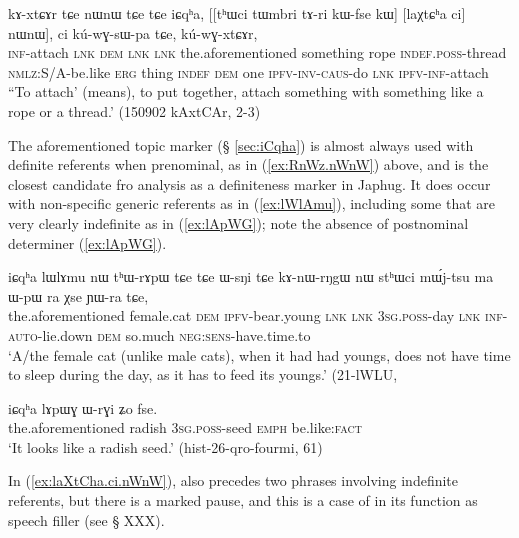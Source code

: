 \begin{exe}
\ex \label{ex:laXtCha.ci.nWnW}
\gll  kɤ-xtɕɤr tɕe nɯnɯ tɕe tɕe iɕqʰa, [[tʰɯci tɯmbri tɤ-ri kɯ-fse kɯ] [laχtɕʰa ci] nɯnɯ], ci kú-wɣ-sɯ-pa tɕe, kú-wɣ-xtɕɤr, \\
\textsc{inf}-attach \textsc{lnk} \textsc{dem} \textsc{lnk} \textsc{lnk} the.aforementioned something rope \textsc{indef}.\textsc{poss}-thread \textsc{nmlz}:S/A-be.like \textsc{erg} thing \textsc{indef} \textsc{dem} one \textsc{ipfv}-\textsc{inv}-\textsc{caus}-do \textsc{lnk} \textsc{ipfv}-\textsc{inf}-attach \\
\glt ``To attach' (means), to put together, attach something with something like a rope or a thread.'  (150902 kAxtCAr, 2-3)
\end{exe}

The aforementioned topic marker  (§ \ref{sec:iCqha}) is almost always used with definite referents when prenominal, as in (\ref{ex:RnWz.nWnW}) above, and is the closest candidate fro analysis as a definiteness marker in Japhug. It does occur with non-specific generic referents as in (\ref{ex:lWlAmu}), including some that are very clearly indefinite as in (\ref{ex:lApWG}); note the absence of postnominal determiner  (\ref{ex:lApWG}).

\begin{exe}
\ex \label{ex:lWlAmu}
 \gll iɕqʰa lɯlɤmu nɯ tʰɯ-rɤpɯ tɕe tɕe ɯ-sŋi tɕe kɤ-nɯ-rŋgɯ nɯ stʰɯci mɯ́j-tsu ma ɯ-pɯ ra χse ɲɯ-ra tɕe, \\
 the.aforementioned female.cat \textsc{dem} \textsc{ipfv}-bear.young \textsc{lnk} \textsc{lnk} \textsc{3sg}.\textsc{poss}-day \textsc{lnk} \textsc{inf}-\textsc{auto}-lie.down \textsc{dem} so.much \textsc{neg}:\textsc{sens}-have.time.to \\
 \glt `A/the female cat (unlike male cats), when it had had youngs, does not have time to sleep during the day, as it has to feed its youngs.' (21-lWLU, 
\end{exe}

\begin{exe}
\ex \label{ex:lApWG}
\gll  iɕqʰa lɤpɯɣ ɯ-rɣi ʑo fse. \\
the.aforementioned radish \textsc{3sg}.\textsc{poss}-seed \textsc{emph} be.like:\textsc{fact} \\
\glt `It looks like a radish seed.' (hist-26-qro-fourmi, 61)
\end{exe}

In  (\ref{ex:laXtCha.ci.nWnW}),   also precedes two phrases involving indefinite referents, but  there is a marked pause, and this is a case of  in its function as speech filler (see § XXX).

